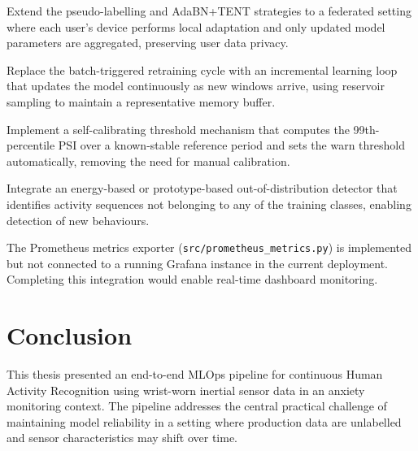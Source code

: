 \begin{description}[style=nextline]

  \item[Federated adaptation.]
    Extend the pseudo-labelling and AdaBN+TENT strategies to a federated
    setting where each user's device performs local adaptation and only
    updated model parameters are aggregated, preserving user data privacy.

  \item[Online learning.]
    Replace the batch-triggered retraining cycle with an incremental learning
    loop that updates the model continuously as new windows arrive, using
    reservoir sampling to maintain a representative memory buffer.

  \item[Automated PSI threshold calibration.]
    Implement a self-calibrating threshold mechanism that computes the
    99th-percentile PSI over a known-stable reference period and sets the
    warn threshold automatically, removing the need for manual calibration.

  \item[Open-set recognition.]
    Integrate an energy-based or prototype-based out-of-distribution detector
    that identifies activity sequences not belonging to any of the
    \nclasses{} training classes, enabling detection of new behaviours.

  \item[Prometheus / Grafana integration.]
    The Prometheus metrics exporter (\texttt{src/prometheus\_metrics.py})
    is implemented but not connected to a running Grafana instance in the
    current deployment.
    Completing this integration would enable real-time dashboard monitoring.

\end{description}

\section{Conclusion}
\label{sec:conclusion}

This thesis presented an end-to-end MLOps pipeline for continuous Human Activity
Recognition using wrist-worn inertial sensor data in an anxiety monitoring
context.
The pipeline addresses the central practical challenge of maintaining model
reliability in a setting where production data are unlabelled and sensor
characteristics may shift over time.

